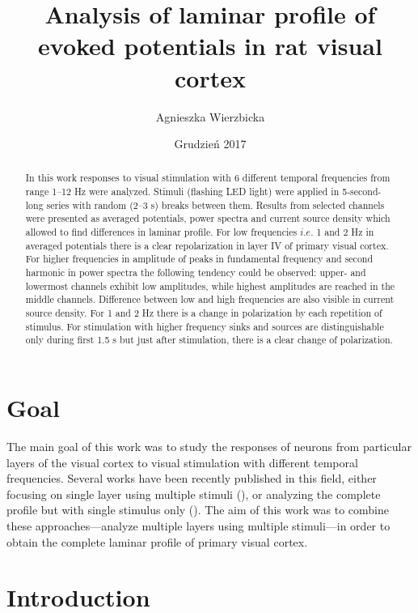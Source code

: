 \documentclass{pracalicmgr}
\author{Agnieszka Wierzbicka}
\title{Analysis of laminar profile of evoked potentials in rat visual cortex}
\date{Grudzień 2017}
\begin{document}
    \maketitle
    \let\cleardoublepage\clearpage
    
    \begin{abstract}
    In this work responses to visual stimulation with 6 different temporal frequencies from range 1--12 Hz were analyzed. Stimuli (flashing LED light) were applied in 5-second-long series with random (2--3 s) breaks between them. Results from selected channels were presented as averaged potentials, power spectra and current source density which allowed to find differences in laminar profile. For low frequencies $i.e.$ 1 and 2 Hz in averaged potentials there is a clear repolarization in layer IV of primary visual cortex. For higher frequencies in amplitude of  peaks in fundamental frequency and second harmonic in power spectra the following tendency could be observed: upper- and lowermost channels exhibit low amplitudes, while highest amplitudes are reached in the middle channels. Difference between low and high frequencies are also visible in current source density. For 1 and 2 Hz there is a change in polarization by each repetition of stimulus. For stimulation with higher frequency sinks and sources are distinguishable only during first 1.5 s but just after  stimulation, there is a clear change of polarization.

     \end{abstract}

  
    \tableofcontents
    
    \chapter*{Goal}
    
    The main goal of this work was to study the responses of neurons from particular layers of the visual cortex to visual stimulation with different temporal frequencies. Several works have been recently published in this field, either focusing on single layer using multiple stimuli (\cite{cooke_bear}), or analyzing the complete profile but with single stimulus only (\cite{maier2011}). The aim of this work was to combine these approaches---analyze multiple layers using multiple stimuli---in order to obtain the complete laminar profile of primary visual cortex.
    

   \chapter{Introduction}
   
\end{document}
